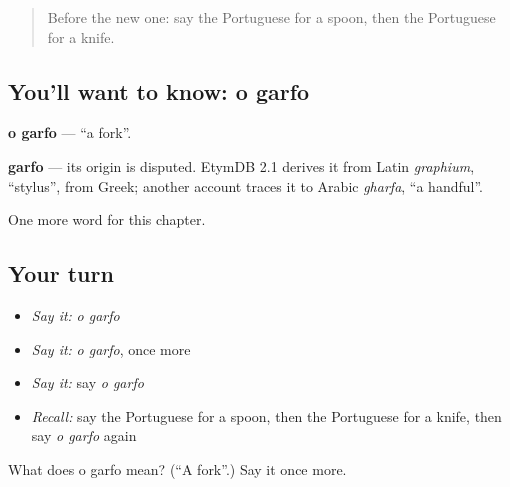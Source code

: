 \label{lesson:PT-C51-garfo}



\begin{quote}
Before the new one: say the Portuguese for a spoon, then the Portuguese for a knife.
\end{quote}

\subsection*{You'll want to know: o garfo}
\textbf{o garfo} — \textquotedblleft{}a fork\textquotedblright{}.

\begin{cousinweb}
\textbf{garfo} — its origin is disputed. EtymDB 2.1 derives it from Latin \emph{graphium}, \textquotedblleft{}stylus\textquotedblright{}, from Greek; another account traces it to Arabic \emph{gharfa}, \textquotedblleft{}a handful\textquotedblright{}.
\end{cousinweb}

\begin{grammarlens}[title={What you've built}]
One more word for this chapter.
\end{grammarlens}

\subsection*{Your turn}
\begin{itemize}
\raggedright
  \item \emph{Say it:} \emph{o garfo}
  \item \emph{Say it:} \emph{o garfo}, once more
  \item \emph{Say it:} say \emph{o garfo}
  \item \emph{Recall:} say the Portuguese for a spoon, then the Portuguese for a knife, then say \emph{o garfo} again
\end{itemize}

\begin{tcolorbox}[breakable,colback=teal!4,colframe=teal!35!black,title={Before you move on}]
What does o garfo mean? (\textquotedblleft{}A fork\textquotedblright{}.) Say it once more.
\end{tcolorbox}
